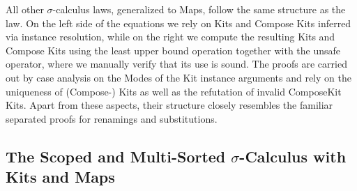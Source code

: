 \documentclass[screen,nonacm]{acmart}
\begin{document}
All other $σ$-calculus laws, generalized to Maps, follow the same structure as
the  law. On the left side of the equations we rely
on Kits and Compose Kits inferred via instance resolution, while on the right
we compute the resulting Kits and Compose Kits using the least upper bound
operation together with the unsafe \AgdaFunction{\_,\_,\_} operator, where we
manually verify that its use is sound. The proofs are carried out by case
analysis on the Modes of the Kit instance arguments and rely on the uniqueness
of (Compose-) Kits as well as the refutation of invalid ComposeKit Kits. Apart
from these aspects, their structure closely resembles the familiar separated
proofs for renamings and substitutions.

\subsection{The Scoped and Multi-Sorted $σ$-Calculus with Kits and Maps}\label{sec:ags-rls}
\end{document}
